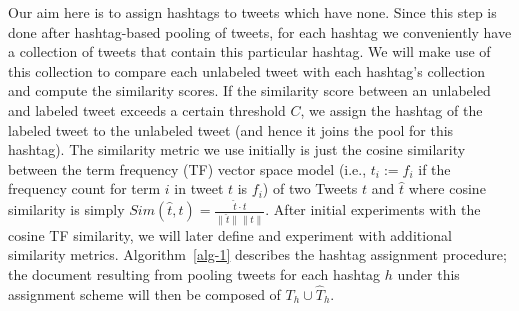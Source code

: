\documentclass[10pt,a5paper,twoside]{article}
\begin{document}
Our aim here is to assign hashtags to tweets which have none. Since
this step is done after hashtag-based pooling of tweets, for each
hashtag we conveniently have a collection of tweets that contain this
particular hashtag.  We will make use of this collection to compare
each unlabeled tweet with each hashtag's collection and compute the
similarity scores. If the similarity score between an unlabeled and
labeled tweet exceeds a certain threshold $C$, we assign the hashtag
of the labeled tweet to the unlabeled tweet (and hence it joins the
pool for this hashtag). The similarity metric we use initially is
just the cosine similarity between the term frequency (TF) vector
space model (i.e., $t_i := f_i$ if the frequency count for term $i$ in
tweet $t$ is $f_i$) of two Tweets $t$ and $\hat{t}$ where cosine
similarity is simply
 $ \mathit{Sim}(\hat{t},t) = \frac{\hat{t} \cdot t}{\|\hat{t}\| \|t\|}.$
After initial experiments with the cosine TF similarity, 
we will later define and experiment with additional similarity metrics.
Algorithm~\ref{alg-1} describes the hashtag assignment procedure;
the document resulting from pooling tweets for each hashtag $h$ under
this assignment scheme will then be composed of $T_h \cup \hat{T}_h$.

\end{document}
